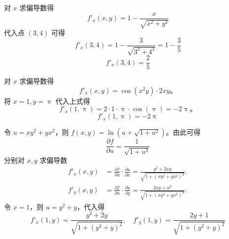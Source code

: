 \begin{solution}

    对 $x$ 求偏导数得
    \begin{equation}
        f'_x(x, y) = 1 - \frac{x}{\sqrt{x^2 + y^2}}
    \end{equation}
    代入点 $(3,4)$ 可得
    \begin{equation}
        f'_x(3,4) = 1 - \frac{3}{\sqrt{3^2 + 4^2}} = 1 - \frac{3}{5}
    \end{equation}
    \begin{equation}
        \boxed{f'_x(3,4) = \frac{2}{5}}
    \end{equation}


    对 $x$ 求偏导数得
    \begin{equation}
        f'_x(x, y) = \cos(x^2 y) \cdot 2xy。
    \end{equation}
    将 $x=1, y=\uppi$ 代入上式得
    \begin{equation}
        f'_x(1, \uppi) = 2 \cdot 1 \cdot \uppi \cdot \cos(\uppi) = -2\uppi。
    \end{equation}
    \begin{equation}
        \boxed{f'_x(1, \uppi) = -2\uppi}
    \end{equation}


    令 $u = xy^2 + yx^2$，则 $f(x,y) = \ln(u + \sqrt{1 + u^2})$。由此可得
    \begin{equation}
        \frac{\partial f}{\partial u} = \frac{1}{\sqrt{1 + u^2}}
    \end{equation}
    分别对 $x, y$ 求偏导数
    \begin{equation}
        \begin{aligned}
            f'_x(x, y) & = \frac{\partial f}{\partial u} \cdot \frac{\partial u}{\partial x} = \frac{y^2 + 2xy}{\sqrt{1 + (xy^2 + yx^2)^2}}, \\
            f'_y(x, y) & = \frac{\partial f}{\partial u} \cdot \frac{\partial u}{\partial y} = \frac{2xy + x^2}{\sqrt{1 + (xy^2 + yx^2)^2}}.
        \end{aligned}
    \end{equation}
    令 $x=1$，则 $u = y^2 + y$，代入得
    \begin{equation}
        \boxed{f'_x(1, y) = \frac{y^2 + 2y}{\sqrt{1 + (y^2 + y)^2}}, \quad f'_y(1, y) = \frac{2y + 1}{\sqrt{1 + (y^2 + y)^2}}}
    \end{equation}
\end{solution}


